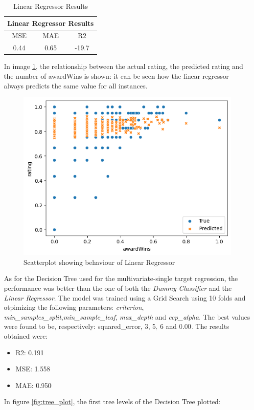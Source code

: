 \documentclass[10pt]{article}
\begin{document}
\begin{table}[h]
    \centering
    \begin{tabular}{|c|c|c|}
    \hline
    \multicolumn{3}{|c|}{Linear Regressor Results} \\
    \hline
    MSE & MAE & R2 \\
    \hline
    0.44 & 0.65 & -19.7 \\
    \hline
    \end{tabular}
    \caption{Linear Regressor Results}
    \label{table:lr_results}
\end{table}

In image \ref{fig:linear_scatterplot}, the relationship between the actual rating, the predicted rating and the number of awardWins is shown: it can be seen how the linear regressor always predicts the same value for all instances.

\begin{figure}[h!]
    \centering
    \includegraphics[width=0.4\linewidth]{linear_scatterplot.png}
    \caption{Scatterplot showing behaviour of Linear Regressor}
    \label{fig:linear_scatterplot}
\end{figure}

As for the Decision Tree used for the multivariate-single target regression, the performance was better than the one of both the \textit{Dummy Classifier} and the \textit{Linear Regressor}. The model was trained using a Grid Search using 10 folds and otpimizing the following parameters: \textit{criterion}, \textit{min\_samples\_split},\textit{min\_sample\_leaf}, \textit{max\_depth} and \textit{ccp\_alpha}. The best values were found to be, respectively: squared\_error, 3, 5, 6 and 0.00.
The results obtained were:
\begin{itemize}
    \item R2: 0.191
    \item MSE: 1.558
    \item MAE: 0.950
\end{itemize}

In figure \ref{fig:tree_plot}, the first tree levels of the Decision Tree plotted: 
\end{document}
